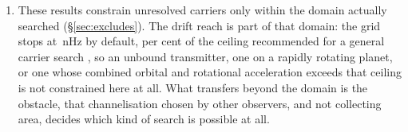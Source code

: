 \begin{enumerate}[leftmargin=1.6em,itemsep=4pt,topsep=4pt,parsep=0pt]
\item These results constrain unresolved carriers only within the domain
actually searched (\S\ref{sec:excludes}). The drift reach is part of that
domain: the grid stops at \DriftCeilLo\,nHz by default, \AccelSheikhPct{} per cent of
the ceiling recommended for a general carrier search \citep{Sheikh2019}, so an
unbound transmitter, one on a rapidly rotating planet, or one whose combined
orbital and rotational acceleration exceeds that ceiling is not constrained
here at all. What transfers beyond the domain is the
obstacle, that channelisation chosen by other observers, and not
collecting area, decides which kind of search is possible at all.

\end{enumerate}
